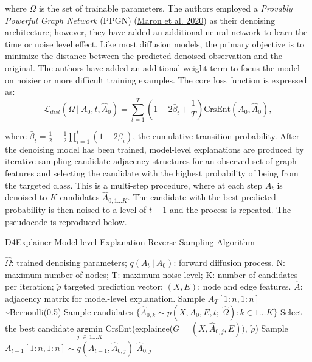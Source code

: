 \documentclass[
  11pt,
  letterpaper,
]{article}
\begin{document}
where \(\Omega\) is the set of trainable parameters. The authors
employed a \emph{Provably Powerful Graph Network} (PPGN)
(\protect\hyperlink{ref-Maron_Ben-Hamu_Serviansky_Lipman_2020}{Maron et
al. 2020}) as their denoising architecture; however, they have added an
additional neural network to learn the time or noise level effect. Like
most diffusion models, the primary objective is to minimize the distance
between the predicted denoised observation and the original. The authors
have added an additional weight term to focus the model on noisier or
more difficult training examples. The core loss function is expressed
as: \begin{equation} \label{L-dist}
    \mathcal{L}_{dist} (\Omega \ | \ A_0, t, \hat A_0) = \sum_{t=1}^T \left(1 - 2 \bar \beta_t + \dfrac 1 T \right) \text{CrsEnt} \left(A_0, \hat A_0 \right), 
\end{equation}

where
\(\bar \beta_t = \frac 1 2 - \frac 1 2 \prod^t_{i=1}(1-2\beta_i)\), the
cumulative transition probability. After the denoising model has been
trained, model-level explanations are produced by iterative sampling
candidate adjacency structures for an observed set of graph features and
selecting the candidate with the highest probability of being from the
targeted class. This is a multi-step procedure, where at each step
\(A_t\) is denoised to \(K\) candidates \(\hat A_{0, 1 \dots K}\). The
candidate with the best predicted probability is then noised to a level
of \(t-1\) and the process is repeated. The pseudocode is reproduced
below.

\begin{algorithm}
\caption{D4Explainer Model-level Explanation Reverse Sampling Algorithm}\label{alg:cap}
\begin{algorithmic}
    \Require $\hat \Omega$: trained denoising parameters; 
            $q(A_t \ | \ A_0)$: forward diffusion process.
    \renewcommand{\algorithmicrequire}{\textbf{Input:}}
    \renewcommand{\algorithmicensure}{\textbf{Output:}}
    \Require N: maximum number of nodes; T: maximum noise level; 
            K: number of candidates per iteration; 
            $\tilde{\rho}$ targeted prediction vector; 
            $(X, E)$: node and edge features.  
    \Ensure $\hat A$: adjacency matrix for model-level explanation.
    \State Sample $A_T[1:n, 1:n]$ \sim Bernoulli(0.5)
        \State Sample candidates 
            $\{\hat A_{0, k} \sim p(X, A_0, E, t; \ \hat \Omega) : k \in 1 \dots K\}$
        \State Select the best candidate 
        $\underset{j \ \in \ 1 \dots K}{\text{argmin}}$ 
        CrsEnt(explainee($G = (X, \hat A_{0, j}, E)), \ \tilde{\rho}$)
        \State Sample $A_{t-1}[1:n, 1:n] \sim q(A_{t-1}, \hat A_{0, j})$
    \EndFor
    \State \Return $\hat A_{0, j}$
\end{algorithmic}
\end{algorithm}
\end{document}
